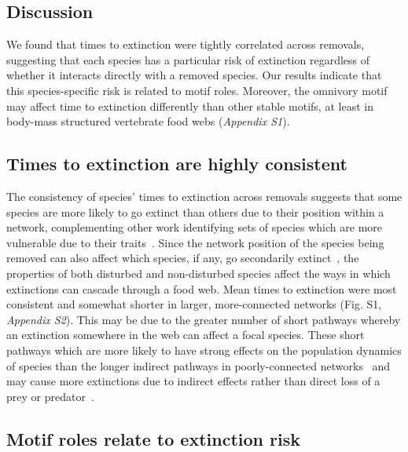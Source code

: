 \documentclass[12pt]{article}
\begin{document}
\begin{spacing}{2.0}
\section*{Discussion}

    We found that times to extinction were tightly correlated across removals, suggesting that each species has a particular risk of extinction regardless of whether it interacts directly with a removed species. 
    Our results indicate that this species-specific risk is related to motif roles.
    Moreover, the omnivory motif may affect time to extinction differently than other stable motifs, at least in body-mass structured vertebrate food webs (\emph{Appendix S1}).


 	\subsection*{Times to extinction are highly consistent}

		The consistency of species' times to extinction across removals suggests that some species are more likely to go extinct than others due to their position within a network, complementing other work identifying sets of species which are more vulnerable due to their traits~\citep{Curtsdotter2011,Ryser2019}. 
		Since the network position of the species being removed can also affect which species, if any, go secondarily extinct~\citep{Wootton2016a,Dunne2002}, the properties of both disturbed and non-disturbed species affect the ways in which extinctions can cascade through a food web.
        Mean times to extinction were most consistent and somewhat shorter in larger, more-connected networks (Fig. S1, \emph{Appendix S2}).
        This may be due to the greater number of short pathways whereby an extinction somewhere in the web can affect a focal species.
        These short pathways which are more likely to have strong effects on the population dynamics of species than the longer indirect pathways in poorly-connected networks~\citep{Jordan2002,Jordan2006} and may cause more extinctions due to indirect effects rather than direct loss of a prey or predator~\citet{Wootton2016a}. 


	\subsection*{Motif roles relate to extinction risk}


\end{spacing}
\end{document}
